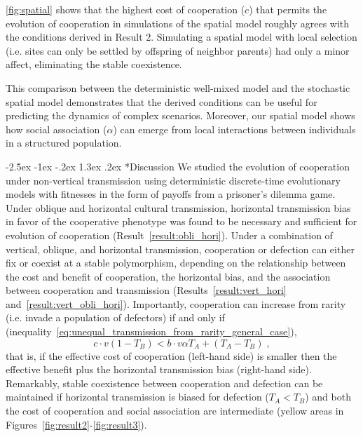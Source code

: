 \documentclass[12pt]{extarticle}
\makeatletter
\renewcommand\section{\@startsection {section}{1}{\z@}%
     {-2.5ex \@plus -1ex \@minus -.2ex}%
     {1.3ex \@plus.2ex}%
    {\Large\bfseries}}
\makeatother
\begin{document}
{\autoref{fig:spatial} shows that the highest cost of cooperation  ($c$) that permits the evolution of cooperation in simulations of the spatial model roughly agrees with the conditions derived in Result 2. Simulating a spatial model with local selection (i.e. sites can only be settled by offspring of neighbor parents) had only a minor affect, eliminating the stable coexistence. 

This comparison between the deterministic well-mixed model and the stochastic spatial model demonstrates that the derived conditions can be useful for predicting the dynamics of complex scenarios. 
Moreover, our spatial model shows how social association ($\alpha$) can emerge from local interactions between individuals in a structured population.


\section*{Discussion}
We studied the evolution of cooperation under non-vertical transmission using deterministic discrete-time evolutionary models with fitnesses in the form of payoffs from a prisoner's dilemma game. 
Under oblique and horizontal cultural transmission, horizontal transmission bias in favor of the cooperative phenotype was found to be necessary and sufficient for evolution of cooperation (Result~\autoref{result:obli_hori}).
Under a combination of vertical, oblique, and horizontal transmission, cooperation or defection can either fix or coexist at a stable polymorphism, depending on the relationship between the cost and benefit of cooperation, the horizontal bias, and the association between cooperation and transmission (Results~\autoref{result:vert_hori} and~\autoref{result:vert_obli_hori}).
Importantly, cooperation can increase from rarity (i.e. invade a population of defectors) if and only if (inequality~\ref{eq:unequal_transmission_from_rarity_general_case}),
\begin{equation}
c \cdot v (1-T_B) < b \cdot v \alpha T_A + (T_A - T_B) \;,
\end{equation}
that is, if the effective cost of cooperation (left-hand side) is smaller then the effective benefit plus the horizontal transmission bias (right-hand side).
Remarkably, stable coexistence between cooperation and defection can be maintained if horizontal transmission is biased for defection ($T_A<T_B$) and both the cost of cooperation and social association are intermediate (yellow areas in Figures~\ref{fig:result2}-\ref{fig:result3}).

}
\end{document}
